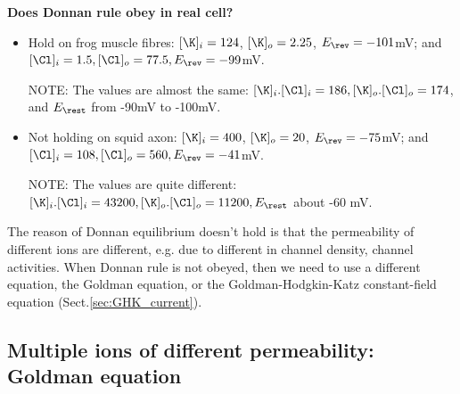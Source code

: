 

{\bf Does Donnan rule obey in real cell?}
\begin{itemize}
  \item Hold on frog muscle fibres: $[\K]_i=124$,
$[\K]_o=2.25$, $E_\rev=-101$mV; and $[\Cl]_i=1.5, [\Cl]_o=77.5, E_\rev=-99$mV.

NOTE: The values are almost the same: $[\K]_i.[\Cl]_i=186, [\K]_o.[\Cl]_o=174$,
and $E_\rest$ from -90mV to -100mV.

   \item Not holding on squid axon: $[\K]_i=400$,
$[\K]_o=20$, $E_\rev=-75$mV; and $[\Cl]_i=108, [\Cl]_o=560, E_\rev=-41$mV.

NOTE: The values are quite different: $[\K]_i.[\Cl]_i=43200,
[\K]_o.[\Cl]_o=11200, E_\rest$ about -60 mV.
\end{itemize}

The reason of Donnan equilibrium doesn't hold is that the permeability of
different ions are different, e.g. due to different in channel density, channel
activities. When Donnan rule is not obeyed, then we need to use a different
equation, the Goldman equation, or the Goldman-Hodgkin-Katz constant-field
equation (Sect.\ref{sec:GHK_current}).

\subsection{Multiple ions of different permeability: Goldman equation}
\label{sec:Goldman-equation}
\label{sec:GHK_voltage}

